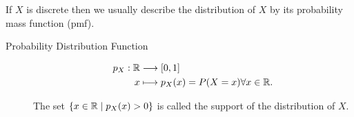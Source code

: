 	If $X$ is discrete then we usually describe the distribution of $X$ by its probability mass function (pmf). 
\begin{description}
	\item[Probability Distribution Function] 
		\begin{align*}
		p_{X}: \mathbb{R} &\longrightarrow [0,1] \\
		x &\longmapsto p_{X}(x) = P(X = x)  \forall x \in  \mathbb{R}
	.\end{align*}

	The set $\{ x \in  \mathbb{R}  \mid  p_{X}(x) > 0\}$ is called the support of the distribution of $X$. 
%
\end{description}	
